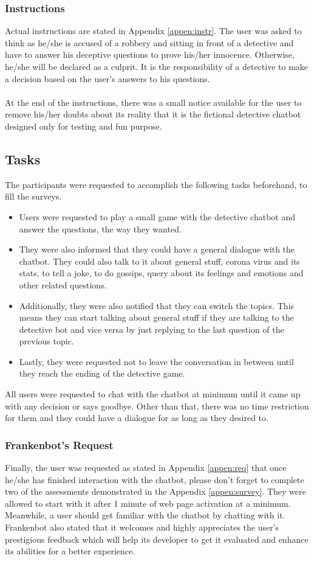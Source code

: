 \subsubsection*{Instructions}
Actual instructions are stated in Appendix \ref{appen:instr}. The user was asked to think as he/she is accused of a robbery and sitting in front of a detective and have to answer his deceptive questions to prove his/her innocence. Otherwise, he/she will be declared as a culprit. It is the responsibility of a detective to make a decision based on the user's answers to his questions.
\\~\\
At the end of the instructions, there was a small notice available for the user to remove his/her doubts about its reality that it is the fictional detective chatbot designed only for testing and fun purpose.

\subsection{Tasks}
The participants were requested to accomplish the following tasks beforehand, to fill the surveys.
\begin{itemize}
    \item Users were requested to play a small game with the detective chatbot and answer the questions, the way they wanted.
    \item They were also informed that they could have a general dialogue with the chatbot. They could also talk to it about general stuff, corona virus and its stats, to tell a joke, to do gossips, query about its feelings and emotions and other related questions.
    \item Additionally, they were also notified that they can switch the topics. This means they can start talking about general stuff if they are talking to the detective bot and vice versa by just replying to the last question of the previous topic.
    \item Lastly, they were requested not to leave the conversation in between until they reach the ending of the detective game. 
\end{itemize} 
\noindent
All users were requested to chat with the chatbot at minimum until it came up with any decision or says goodbye. Other than that, there was no time restriction for them and they could have a dialogue for as long as they desired to.

\subsubsection*{Frankenbot's Request}
Finally, the user was requested as stated in Appendix \ref{appen:req} that once he/she has finished interaction with the chatbot, please don't forget to complete two of the assessments demonstrated in the Appendix \ref{appen:survey}. They were allowed to start with it after 1 minute of web page activation at a minimum. Meanwhile, a user should get familiar with the chatbot by chatting with it. Frankenbot also stated that it welcomes and highly appreciates the user's prestigious feedback which will help its developer to get it evaluated and enhance its abilities for a better experience.


